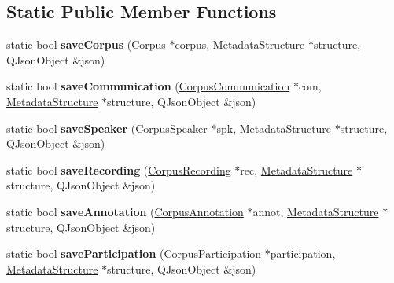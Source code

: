 \subsection*{Static Public Member Functions}
\begin{DoxyCompactItemize}
\item 
\mbox{\label{class_j_s_o_n_serialiser_metadata_a63fb3f41190cd3f9c3c58dfc210151aa}} 
static bool {\bfseries save\+Corpus} (\hyperlink{class_corpus}{Corpus} $\ast$corpus, \hyperlink{class_metadata_structure}{Metadata\+Structure} $\ast$structure, Q\+Json\+Object \&json)
\item 
\mbox{\label{class_j_s_o_n_serialiser_metadata_ab611e009e7ff4ea7b5d611976450ee09}} 
static bool {\bfseries save\+Communication} (\hyperlink{class_corpus_communication}{Corpus\+Communication} $\ast$com, \hyperlink{class_metadata_structure}{Metadata\+Structure} $\ast$structure, Q\+Json\+Object \&json)
\item 
\mbox{\label{class_j_s_o_n_serialiser_metadata_ad5744cb5bcc58d06b572f32bb1f12da4}} 
static bool {\bfseries save\+Speaker} (\hyperlink{class_corpus_speaker}{Corpus\+Speaker} $\ast$spk, \hyperlink{class_metadata_structure}{Metadata\+Structure} $\ast$structure, Q\+Json\+Object \&json)
\item 
\mbox{\label{class_j_s_o_n_serialiser_metadata_a41a4eec18e3e631376e8eff13b0a6418}} 
static bool {\bfseries save\+Recording} (\hyperlink{class_corpus_recording}{Corpus\+Recording} $\ast$rec, \hyperlink{class_metadata_structure}{Metadata\+Structure} $\ast$structure, Q\+Json\+Object \&json)
\item 
\mbox{\label{class_j_s_o_n_serialiser_metadata_afca236c2a0bd65000dbdd638b405971b}} 
static bool {\bfseries save\+Annotation} (\hyperlink{class_corpus_annotation}{Corpus\+Annotation} $\ast$annot, \hyperlink{class_metadata_structure}{Metadata\+Structure} $\ast$structure, Q\+Json\+Object \&json)
\item 
\mbox{\label{class_j_s_o_n_serialiser_metadata_af12f5dbdf3994052c7dc2cd1eef4cf67}} 
static bool {\bfseries save\+Participation} (\hyperlink{class_corpus_participation}{Corpus\+Participation} $\ast$participation, \hyperlink{class_metadata_structure}{Metadata\+Structure} $\ast$structure, Q\+Json\+Object \&json)

\end{DoxyCompactItemize}
